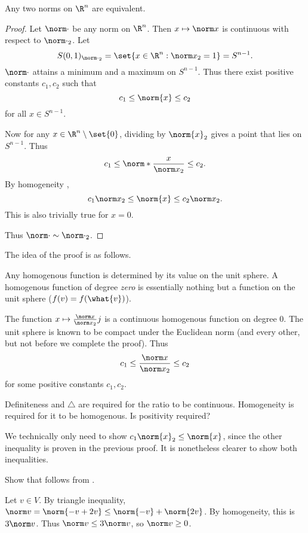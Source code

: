 \begin{theorem*} \label{thm:norm:eq}
    Any two norms on $\R^n$ are equivalent.
\end{theorem*}
\begin{proof}
    Let $\norm\cdot$ be any norm on $\R^n$.
    Then $x \mapsto \norm x$ is continuous with respect to ${\norm\cdot}_2$.
    Let \[
        S(0, 1)_{{\norm\cdot}_2} = \set{x \in \R^n : {\norm x}_2 = 1}
                      = S^{n-1}.
    \] $\norm\cdot$ attains a minimum and a maximum on $S^{n-1}$.
    Thus there exist positive constants $c_1, c_2$ such that \[
        c_1 \le \norm{x} \le c_2
    \] for all $x \in S^{n-1}$.

    Now for any $x \in \R^n \setminus \set{0}$,
    dividing by $\norm{x}_2$ gives a point that lies on $S^{n-1}$.
    Thus \[
        c_1 \le \norm*{\frac{x}{{\norm x}_2}} \le c_2.
    \] By homogeneity , \[
        c_1 {\norm x}_2 \le \norm{x} \le c_2 {\norm x}_2.
    \] This is also trivially true for $x = 0$.

    Thus $\norm\cdot \sim {\norm\cdot}_2$.
\end{proof}
\begin{remark}
    The idea of the proof is as follows.

    Any homogenous function is determined by its value on the unit sphere.
    A homogenous function of degree \emph{zero} is essentially nothing but
    a function on the unit sphere ($f(v) = f(\what{v})$).

    The function $x \mapsto \frac{\norm x}{{\norm x}_2}j$ is a
    continuous homogenous function on degree $0$.
    The unit sphere is known to be compact under the Euclidean norm
    (and every other, but not before we complete the proof).
    Thus \[
        c_1 \le \frac{\norm x}{{\norm x}_2} \le c_2
    \] for some positive constants $c_1, c_2$.

    Definiteness and $\triangle$ are required for the ratio to be
    continuous.
    Homogeneity is required for it to be homogenous.
    Is positivity required? %
\end{remark}
\begin{remark}
    We technically only need to show $c_1 \norm{x}_2 \le \norm{x}$,
    since the other inequality is proven in the previous proof.
    It is nonetheless clearer to show both inequalities.
\end{remark}

\begin{exercise}[Self]
    Show that  follows from
    .
\end{exercise}
\begin{solution}
    Let $v \in V$.
    By triangle inequality,
    $\norm v = \norm{-v + 2v} \le \norm{-v} + \norm{2v}$.
    By homogeneity, this is $3\norm v$.
    Thus $\norm v \le 3\norm v$, so $\norm v \ge 0$.
\end{solution}


